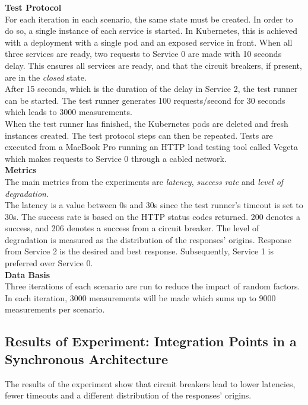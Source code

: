 \noindent
\textbf{Test Protocol}
\\
For each iteration in each scenario, the same state must be created. In order to do so, a single instance of each service is started. In Kubernetes, this is achieved with a deployment with a single pod and an exposed service in front. When all three services are ready, two requests to Service 0 are made with 10 seconds delay. This ensures all services are ready, and that the circuit breakers, if present, are in the \textit{closed} state. \\
After 15 seconds, which is the duration of the delay in Service 2, the test runner can be started. The test runner generates 100 requests/second for 30 seconds which leads to 3000 measurements.\\

\noindent
When the test runner has finished, the Kubernetes pods are deleted and fresh instances created. The test protocol steps can then be repeated. Tests are executed from a MacBook Pro running an HTTP load testing tool called Vegeta which makes requests to Service 0 through a cabled network. \\

\noindent
\textbf{Metrics} \\
The main metrics from the experiments are \textit{latency}, \textit{success rate} and \textit{level of degradation}.\\

\noindent
The latency is a value between 0s and 30s since the test runner's timeout is set to 30s. The success rate is based on the HTTP status codes returned. 200 denotes a success, and 206 denotes a success from a circuit breaker. The level of degradation is measured as the distribution of the responses' origins. Response from Service 2 is the desired and best response. Subsequently, Service 1 is preferred over Service 0. \\


\noindent
\textbf{Data Basis}
\\
Three iterations of each scenario are run to reduce the impact of random factors. In each iteration, 3000 measurements will be made which sums up to 9000 measurements per scenario.

\subsection*{Results of Experiment: Integration Points in a Synchronous Architecture}
The results of the experiment show that circuit breakers lead to lower latencies, fewer timeouts and a different distribution of the responses' origins. \\

